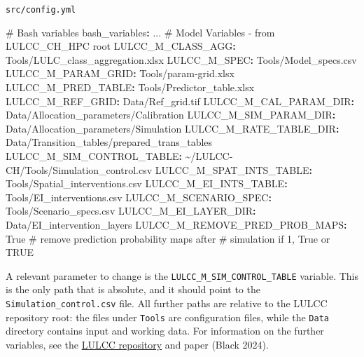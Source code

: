 \documentclass[
  letterpaper,
  DIV=11,
  numbers=noendperiod]{scrreprt}
\newenvironment{Shaded}{\begin{snugshade}}{\end{snugshade}}
\newcommand{\AttributeTok}[1]{\textcolor[rgb]{0.40,0.45,0.13}{#1}}
\newcommand{\CharTok}[1]{\textcolor[rgb]{0.13,0.47,0.30}{#1}}
\newcommand{\CommentTok}[1]{\textcolor[rgb]{0.37,0.37,0.37}{#1}}
\newcommand{\FunctionTok}[1]{\textcolor[rgb]{0.28,0.35,0.67}{#1}}
\newcommand{\KeywordTok}[1]{\textcolor[rgb]{0.00,0.23,0.31}{\textbf{#1}}}
\begin{document}
\begin{codelisting}

\caption{\texttt{src/config.yml}}

\begin{Shaded}
\begin{Highlighting}[]
\CommentTok{\# Bash variables}
\FunctionTok{bash\_variables}\KeywordTok{:}
\AttributeTok{  ...}
\CommentTok{  \# Model Variables {-} from LULCC\_CH\_HPC root}
\AttributeTok{  }\FunctionTok{LULCC\_M\_CLASS\_AGG}\KeywordTok{:}\AttributeTok{ Tools/LULC\_class\_aggregation.xlsx}
\AttributeTok{  }\FunctionTok{LULCC\_M\_SPEC}\KeywordTok{:}\AttributeTok{ Tools/Model\_specs.csv}
\AttributeTok{  }\FunctionTok{LULCC\_M\_PARAM\_GRID}\KeywordTok{:}\AttributeTok{ Tools/param{-}grid.xlsx}
\AttributeTok{  }\FunctionTok{LULCC\_M\_PRED\_TABLE}\KeywordTok{:}\AttributeTok{ Tools/Predictor\_table.xlsx}
\AttributeTok{  }\FunctionTok{LULCC\_M\_REF\_GRID}\KeywordTok{:}\AttributeTok{ Data/Ref\_grid.tif}
\AttributeTok{  }\FunctionTok{LULCC\_M\_CAL\_PARAM\_DIR}\KeywordTok{:}\AttributeTok{ Data/Allocation\_parameters/Calibration}
\AttributeTok{  }\FunctionTok{LULCC\_M\_SIM\_PARAM\_DIR}\KeywordTok{:}\AttributeTok{ Data/Allocation\_parameters/Simulation}
\AttributeTok{  }\FunctionTok{LULCC\_M\_RATE\_TABLE\_DIR}\KeywordTok{:}\AttributeTok{ Data/Transition\_tables/prepared\_trans\_tables}
\AttributeTok{  }\FunctionTok{LULCC\_M\_SIM\_CONTROL\_TABLE}\KeywordTok{:}\AttributeTok{ \textasciitilde{}/LULCC{-}CH/Tools/Simulation\_control.csv}
\AttributeTok{  }\FunctionTok{LULCC\_M\_SPAT\_INTS\_TABLE}\KeywordTok{:}\AttributeTok{ Tools/Spatial\_interventions.csv}
\AttributeTok{  }\FunctionTok{LULCC\_M\_EI\_INTS\_TABLE}\KeywordTok{:}\AttributeTok{ Tools/EI\_interventions.csv}
\AttributeTok{  }\FunctionTok{LULCC\_M\_SCENARIO\_SPEC}\KeywordTok{:}\AttributeTok{ Tools/Scenario\_specs.csv}
\AttributeTok{  }\FunctionTok{LULCC\_M\_EI\_LAYER\_DIR}\KeywordTok{:}\AttributeTok{ Data/EI\_intervention\_layers}
\AttributeTok{  }\FunctionTok{LULCC\_M\_REMOVE\_PRED\_PROB\_MAPS}\KeywordTok{:}\AttributeTok{ }\CharTok{True}\CommentTok{ \# remove prediction probability maps after}
\CommentTok{  \# simulation if 1, True or TRUE}
\end{Highlighting}
\end{Shaded}

\end{codelisting}

A relevant parameter to change is the
\texttt{LULCC\_M\_SIM\_CONTROL\_TABLE} variable. This is the only path
that is absolute, and it should point to the
\texttt{Simulation\_control.csv} file. All further paths are relative to
the LULCC repository root: the files under \texttt{Tools} are
configuration files, while the \texttt{Data} directory contains input
and working data. For information on the further variables, see the
\href{https://github.com/blenback/LULCC-CH}{LULCC repository} and paper
(Black 2024).
\end{document}
